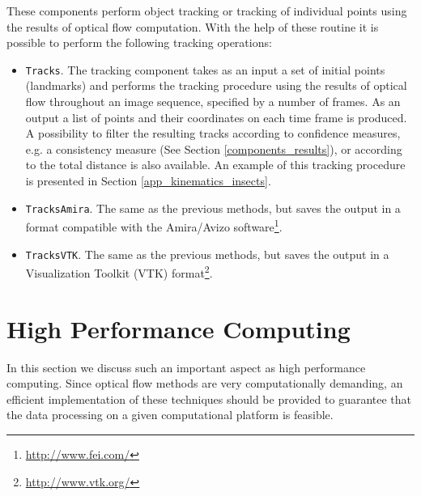These components perform object tracking or tracking of individual points using the results of optical flow computation. With the help of these routine it is possible to perform the following tracking operations:
\begin{itemize}
	\item \texttt{Tracks}. The tracking component takes as an input a set of initial points (landmarks) and performs the tracking procedure using the results of optical flow throughout an image sequence, specified by a number of frames. As an output a list of points and their coordinates on each time frame is produced. A possibility to filter the resulting tracks according to confidence measures, e.g. a consistency measure (See Section  \ref{components_results}), or according to the total distance is also available. An example of this tracking procedure is presented in Section \ref{app_kinematics_insects}. 
	
	\item \texttt{TracksAmira}. The same as the previous methods, but saves the output in a format compatible with the Amira/Avizo software\footnote{\url{http://www.fei.com/}}.
	
	\item \texttt{TracksVTK}. The same as the previous methods, but saves the output in a Visualization Toolkit (VTK) format\footnote{\url{http://www.vtk.org/}}. 
\end{itemize}















\section {High Performance Computing}
\label{performance}

In this section we discuss such an important aspect as high performance computing. Since optical flow methods are very computationally demanding, an efficient implementation of these techniques should be provided to guarantee that the data processing on a given computational platform is feasible.

